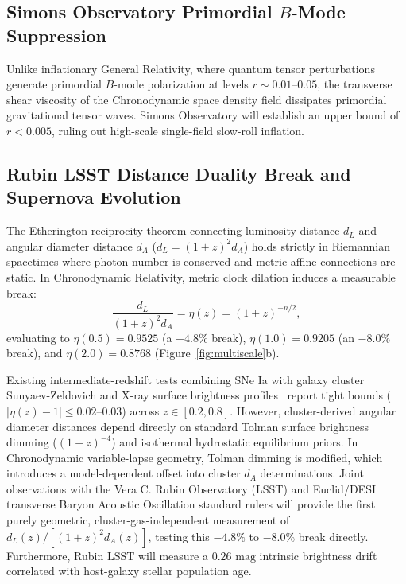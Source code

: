 \documentclass[aps,prd,reprint,superscriptaddress,nofootinbib,twocolumn,floatfix]{revtex4-2}
\begin{document}
\subsection{Simons Observatory Primordial \texorpdfstring{$B$}{B}-Mode Suppression}
Unlike inflationary General Relativity, where quantum tensor perturbations generate primordial $B$-mode polarization at levels $r \sim 0.01\text{--}0.05$, the transverse shear viscosity of the Chronodynamic space density field dissipates primordial gravitational tensor waves. Simons Observatory will establish an upper bound of $r < 0.005$, ruling out high-scale single-field slow-roll inflation.

\subsection{Rubin LSST Distance Duality Break and Supernova Evolution}
\label{sec:rubin}
The Etherington reciprocity theorem connecting luminosity distance $d_L$ and angular diameter distance $d_A$ ($d_L = (1+z)^2 d_A$) holds strictly in Riemannian spacetimes where photon number is conserved and metric affine connections are static. In Chronodynamic Relativity, metric clock dilation induces a measurable break:
\begin{equation}
\frac{d_L}{(1+z)^2 d_A} = \eta(z) = (1+z)^{-n/2},
\end{equation}
evaluating to $\eta(0.5) = 0.9525$ (a $-4.8\%$ break), $\eta(1.0) = 0.9205$ (an $-8.0\%$ break), and $\eta(2.0) = 0.8768$ (Figure~\ref{fig:multiscale}b).

Existing intermediate-redshift tests combining SNe Ia with galaxy cluster Sunyaev-Zeldovich and X-ray surface brightness profiles~\cite{mantz2014distance,li2018testing} report tight bounds ($|\eta(z) - 1| \le 0.02\text{--}0.03$) across $z \in [0.2, 0.8]$. However, cluster-derived angular diameter distances depend directly on standard Tolman surface brightness dimming ($(1+z)^{-4}$) and isothermal hydrostatic equilibrium priors. In Chronodynamic variable-lapse geometry, Tolman dimming is modified, which introduces a model-dependent offset into cluster $d_A$ determinations. Joint observations with the Vera C. Rubin Observatory (LSST) and Euclid/DESI transverse Baryon Acoustic Oscillation standard rulers will provide the first purely geometric, cluster-gas-independent measurement of $d_L(z)/[(1+z)^2 d_A(z)]$, testing this $-4.8\%$ to $-8.0\%$ break directly. Furthermore, Rubin LSST will measure a $0.26\text{ mag}$ intrinsic brightness drift correlated with host-galaxy stellar population age.
\end{document}
